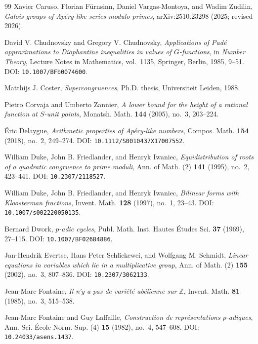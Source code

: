 \documentclass[11pt]{amsart}
\theoremstyle{plain}
\theoremstyle{remark}
\begin{document}
\begin{thebibliography}{99}
Xavier Caruso, Florian F\"urnsinn, Daniel Vargas-Montoya, and
Wadim Zudilin,
\emph{Galois groups of Ap\'ery-like series modulo primes},
arXiv:2510.23298 (2025; revised 2026).

David V. Chudnovsky and Gregory V. Chudnovsky,
\emph{Applications of Pad\'e approximations to Diophantine
inequalities in values of $G$-functions},
in \emph{Number Theory}, Lecture Notes in Mathematics, vol.~1135,
Springer, Berlin, 1985, 9--51.
DOI: \texttt{10.1007/BFb0074600}.

Matthijs J. Coster,
\emph{Supercongruences},
Ph.D. thesis, Universiteit Leiden, 1988.

Pietro Corvaja and Umberto Zannier,
\emph{A lower bound for the height of a rational function at
$S$-unit points},
Monatsh. Math. \textbf{144} (2005), no.~3, 203--224.

\'Eric Delaygue,
\emph{Arithmetic properties of Ap\'ery-like numbers},
Compos. Math. \textbf{154} (2018), no.~2, 249--274.
DOI: \texttt{10.1112/S0010437X17007552}.

William Duke, John B. Friedlander, and Henryk Iwaniec,
\emph{Equidistribution of roots of a quadratic congruence to prime
moduli},
Ann. of Math. (2) \textbf{141} (1995), no.~2, 423--441.
DOI: \texttt{10.2307/2118527}.

William Duke, John B. Friedlander, and Henryk Iwaniec,
\emph{Bilinear forms with Kloosterman fractions},
Invent. Math. \textbf{128} (1997), no.~1, 23--43.
DOI: \texttt{10.1007/s002220050135}.

Bernard Dwork,
\emph{$p$-adic cycles},
Publ. Math. Inst. Hautes \'Etudes Sci. \textbf{37} (1969), 27--115.
DOI: \texttt{10.1007/BF02684886}.

Jan-Hendrik Evertse, Hans Peter Schlickewei, and Wolfgang M. Schmidt,
\emph{Linear equations in variables which lie in a multiplicative
group},
Ann. of Math. (2) \textbf{155} (2002), no.~3, 807--836.
DOI: \texttt{10.2307/3062133}.

Jean-Marc Fontaine,
\emph{Il n'y a pas de vari\'et\'e ab\'elienne sur $\mathbb Z$},
Invent. Math. \textbf{81} (1985), no.~3, 515--538.

Jean-Marc Fontaine and Guy Laffaille,
\emph{Construction de repr\'esentations $p$-adiques},
Ann. Sci. \'Ecole Norm. Sup. (4) \textbf{15} (1982), no.~4, 547--608.
DOI: \texttt{10.24033/asens.1437}.


\end{thebibliography}
\end{document}
